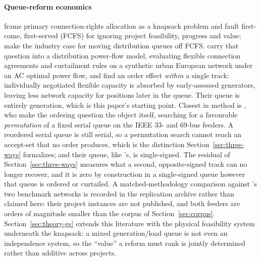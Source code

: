 \documentclass[review,authoryear,12pt]{elsarticle}
\begin{document}
\paragraph{Queue-reform economics}
\citet{pollitt2026} frame primary connection-rights allocation as a knapsack
problem and fault first-come, first-served (FCFS) for ignoring project
feasibility, progress and value; \citet{eurelectric2025} make the industry
case for moving distribution queues off FCFS. \citet{desanti2025} carry that
question into a distribution power-flow model, evaluating flexible connection
agreements and curtailment rules on a synthetic urban European network under
an AC optimal power flow, and find an order effect \emph{within} a single
track: individually negotiated flexible capacity is absorbed by
early-assessed generators, leaving less network capacity for positions later
in the queue. Their queue is entirely generation, which is this paper's
starting point. Closest in method is \citet{fontinele2026}, who make the
ordering question the object itself, searching for a favourable \emph{permutation}
of a fixed serial queue on the IEEE 33- and 69-bus feeders. A reordered serial
queue is still serial, so a permutation search cannot reach an accept-set that
no order produces, which is the distinction Section~\ref{sec:three-ways}
formalizes; and their queue, like \citet{desanti2025}'s, is single-signed. The
residual of Section~\ref{sec:three-ways} measures what a
second, opposite-signed track can no longer recover, and it is zero by
construction in a single-signed queue however that queue is ordered or
curtailed. A matched-methodology comparison against \citeauthor{fontinele2026}'s
two benchmark networks is recorded in the replication archive rather than
claimed here: their project instances are not published, and both feeders are
orders of magnitude smaller than the corpus of Section~\ref{sec:corpus}. Section~\ref{sec:theory-gs} extends this literature with the
physical feasibility system underneath the knapsack: a mixed generation/load
queue is not even an independence system, so the ``value'' a reform must rank
is jointly determined rather than additive across projects.
\end{document}
